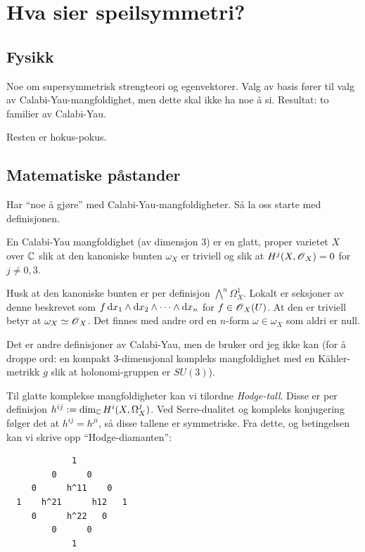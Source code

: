 \documentclass[11pt, norsk]{article}
\begin{document}
\section{Hva sier speilsymmetri?}

\subsection{Fysikk}

Noe om supersymmetrisk strengteori og egenvektorer. Valg av basis fører til valg av Calabi-Yau-mangfoldighet, men dette skal ikke ha noe å si. Resultat: to familier av Calabi-Yau.

Resten er hokus-pokus.


\subsection{Matematiske påstander}

Har ``noe å gjøre'' med Calabi-Yau-mangfoldigheter. Så la oss starte med definisjonen. 

\begin{defi}
  En Calabi-Yau mangfoldighet (av dimensjon $3$) er en glatt, proper varietet $X$ over $\mathbb{C}$ slik at den kanoniske bunten $\omega_X$ er triviell og slik at $H^j(X, \operatorname{\mathscr{O}}_X)=0$ for $j \neq 0,3$. 
\end{defi}

Husk at den kanoniske bunten er per definisjon $\bigwedge^n \Omega_X^1$. Lokalt er seksjoner av denne beskrevet som $f\, \mathrm{d}{x}_1 \wedge \mathrm{d}{x}_2 \wedge \cdots \wedge \mathrm{d}{x}_n$ for $f \in \operatorname{\mathscr{O}}_X(U)$. At den er triviell betyr at $\omega_X \simeq \operatorname{\mathscr{O}}_X$. Det finnes med andre ord en $n$-form $\omega \in \omega_X$ som aldri er null.

Det er andre definisjoner av Calabi-Yau, men de bruker ord jeg ikke kan (for å droppe ord: en kompakt $3$-dimensjonal kompleks mangfoldighet med en Kähler-metrikk $g$ slik at holonomi-gruppen er $SU(3)$). 

Til glatte komplekse mangfoldigheter kan vi tilordne \emph{Hodge-tall}. Disse er per definisjon $h^{ij}:= \dim_{\mathbb{C}} H^i(X,\Omega^j_X)$. Ved Serre-dualitet og kompleks konjugering følger det at $h^{ij}=h^{ji}$, så disse tallene er symmetriske. Fra dette, og betingelsen kan vi skrive opp ``Hodge-diamanten'':

\begin{verbatim}
             1
         0      0
     0      h^11    0  
  1    h^21      h12   1
     0      h^22   0   
         0      0
             1
\end{verbatim}
\end{document}

